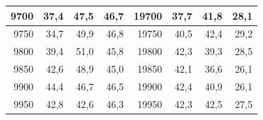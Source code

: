 \begin{small}
\begin{longtable}{|r|r|r|r|r|r|r|r|}
9700 & 37,4 & 47,5 & 46,7 & 19700 & 37,7 & 41,8 & 28,1 \\ \hline
9750 & 34,7 & 49,9 & 46,8 & 19750 & 40,5 & 42,4 & 29,2 \\ \hline
9800 & 39,4 & 51,0 & 45,8 & 19800 & 42,3 & 39,3 & 28,5 \\ \hline
9850 & 42,6 & 48,9 & 45,0 & 19850 & 42,1 & 36,6 & 26,1 \\ \hline
9900 & 44,4 & 46,7 & 46,5 & 19900 & 42,4 & 40,9 & 26,1 \\ \hline
9950 & 42,8 & 42,6 & 46,3 & 19950 & 42,3 & 42,5 & 27,5 \\ \hline
\end{longtable}
\end{small}